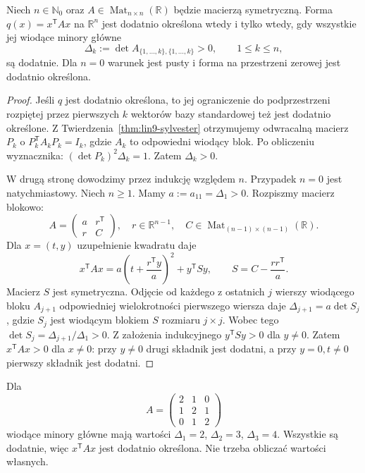 \begin{twierdzenie}
\label{thm:lin9-kryterium-sylvestera}
Niech \(n\in\mathbb N_0\) oraz
\(A\in\operatorname{Mat}_{n\times n}(\mathbb R)\)
będzie macierzą symetryczną.
Forma \(q(x)=x^{\mathsf T}Ax\) na \(\mathbb R^n\)
jest dodatnio określona wtedy i tylko wtedy,
gdy wszystkie jej wiodące minory główne
\[
 \Delta_k:=\det A_{\{1,\ldots,k\},\{1,\ldots,k\}}>0,
 \qquad 1\le k\le n,
\]
są dodatnie. Dla \(n=0\) warunek jest pusty
i forma na przestrzeni zerowej jest
dodatnio określona.
\end{twierdzenie}
\begin{proof}
Jeśli \(q\) jest dodatnio określona, to
jej ograniczenie do podprzestrzeni rozpiętej
przez pierwszych \(k\) wektorów bazy
standardowej też jest dodatnio określone.
Z
Twierdzenia~\ref{thm:lin9-sylvester}
otrzymujemy odwracalną macierz \(P_k\)
o \(P_k^{\mathsf T}A_kP_k=I_k\), gdzie
\(A_k\) to odpowiedni wiodący blok.
Po obliczeniu wyznacznika:
\((\det P_k)^2\Delta_k=1\).
Zatem \(\Delta_k>0\).

W drugą stronę dowodzimy przez indukcję
względem \(n\). Przypadek \(n=0\)
jest natychmiastowy. Niech \(n\ge1\).
Mamy \(a:=a_{11}=\Delta_1>0\).
Rozpiszmy macierz blokowo:
\[
 A=\begin{pmatrix}a&r^{\mathsf T}\\r&C\end{pmatrix},
 \quad r\in\mathbb R^{n-1},
 \quad C\in\operatorname{Mat}_{(n-1)\times(n-1)}(\mathbb R).
\]
Dla \(x=(t,y)\) uzupełnienie kwadratu daje
\[
 x^{\mathsf T}Ax
 =a\left(t+\frac{r^{\mathsf T}y}{a}\right)^2
  +y^{\mathsf T}Sy,\qquad
 S=C-\frac{rr^{\mathsf T}}{a}.
\]
Macierz \(S\) jest symetryczna.
Odjęcie od każdego z ostatnich \(j\)
wierszy wiodącego bloku \(A_{j+1}\)
odpowiedniej wielokrotności pierwszego
wiersza daje
\(\Delta_{j+1}=a\det S_j\),
gdzie \(S_j\) jest wiodącym
blokiem \(S\) rozmiaru \(j\times j\).
Wobec tego
\(\det S_j=\Delta_{j+1}/\Delta_1>0\).
Z założenia indukcyjnego
\(y^{\mathsf T}Sy>0\) dla \(y\ne0\).
Zatem \(x^{\mathsf T}Ax>0\) dla
\(x\ne0\): przy \(y\ne0\)
drugi składnik jest dodatni,
a przy \(y=0,t\ne0\)
pierwszy składnik jest dodatni.
\end{proof}

\begin{przyklad}
\label{prz:lin9-kryterium3}
Dla
\[
 A=\begin{pmatrix}2&1&0\\1&2&1\\0&1&2\end{pmatrix}
\]
wiodące minory główne mają wartości
\(\Delta_1=2\), \(\Delta_2=3\),
\(\Delta_3=4\). Wszystkie są dodatnie,
więc \(x^{\mathsf T}Ax\) jest
dodatnio określona. Nie trzeba
obliczać wartości własnych.
\end{przyklad}

